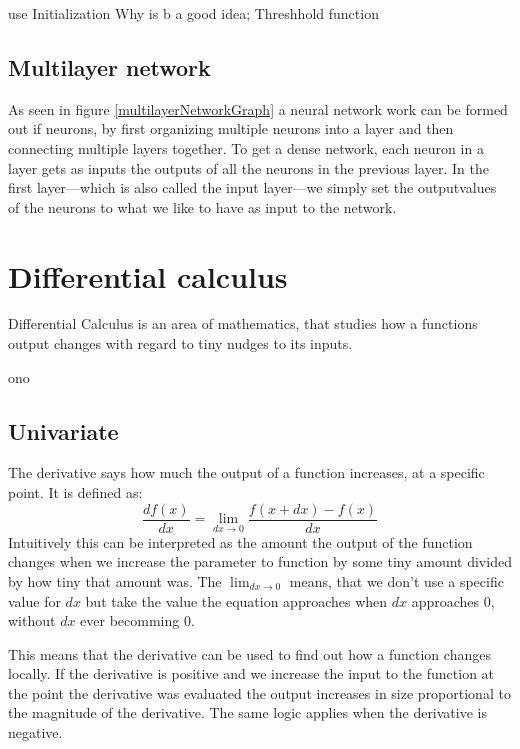use
Initialization
Why is b a good idea; Threshhold function


\multilayerNetworkGraph[p]

\subsection{Multilayer network}
As seen in figure \ref{multilayerNetworkGraph} a neural network work can be formed out if neurons, by first organizing multiple neurons into a layer and then connecting multiple layers together. To get a dense network, each neuron in a layer gets as inputs the outputs of all the neurons in the previous layer. In the first layer---which is also called the input layer---we simply set the outputvalues of the neurons to what we like to have as input to the network.

\section{Differential calculus}
Differential Calculus is an area of mathematics, that studies how a functions output changes with regard to tiny nudges to its inputs.
\begin{centering}
	ono
\end{centering}


\subsection{Univariate}
The derivative says how much the output of a function increases, at a specific point. It is defined as:
\begin{equation}
	\frac{df(x)}{dx} = \lim_{dx \to 0}\frac{f(x + dx) - f(x)}{dx}
\end{equation}
Intuitively this can be interpreted as the amount the output of the function changes when we increase the parameter to function by some tiny amount divided by how tiny that amount was. The $\lim_{dx \to 0}$ means, that we don't use a specific value for $dx$ but take the value the equation approaches when $dx$ approaches $0$, without $dx$ ever becomming $0$.

This means that the derivative can be used to find out how a function changes locally. If the derivative is positive and we increase the input to the function at the point the derivative was evaluated the output increases in size proportional to the magnitude of the derivative. The same logic applies when the derivative is negative.

